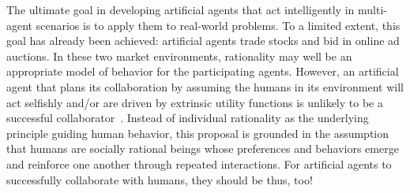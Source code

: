 The ultimate goal in developing artificial agents that act
intelligently in multi-agent scenarios is to apply them to real-world
problems.  To a limited extent, this goal has already been achieved:
artificial agents trade stocks and bid in online ad auctions.  In
these two market environments, rationality may well be an appropriate
model of behavior for the participating agents.  However,
an artificial agent that plans its collaboration by assuming the
humans in its environment will act selfishly and/or are driven by
extrinsic utility functions is unlikely to be a successful
collaborator~\cite{Camerer:2003,gal04,kahnemanst82}.  Instead of
individual rationality as the underlying principle guiding human
behavior, this proposal is grounded in the assumption that humans are
socially rational beings whose preferences and behaviors emerge and
reinforce one another through repeated interactions.  For artificial
agents to successfully collaborate with humans, they should be thus,
too!

